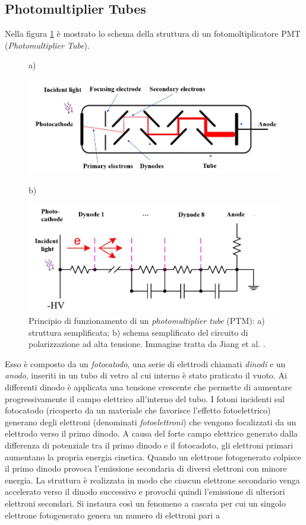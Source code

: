 \subsection{Photomultiplier Tubes}
Nella figura \ref{fig:ptm} è mostrato lo schema della struttura di un fotomoltiplicatore PMT (\textit{Photomultiplier Tube}).
\begin{figure}[tbh]
	\centering
	a)
	\begin{minipage}{.70\textwidth}
		\includegraphics[width=\linewidth]{./ImageFiles/ptm.jpg}
	\end{minipage}

	b)
	\begin{minipage}{.70\textwidth}
		\includegraphics[width=\linewidth]{./ImageFiles/ptm_schema.jpg}
	\end{minipage}
	\caption{Principio di funzionamento di un \textit{photomultiplier tube} (PTM): a) struttura semplificata; b) schema semplificato del circuito di polarizzazione ad alta tensione. Immagine tratta da Jiang et al. \cite{Jiang2019}.}
	\label{fig:ptm}
\end{figure}
Esso è composto da un \textit{fotocatodo}, una serie di elettrodi chiamati \textit{dinodi} e un \textit{anodo}, inseriti in un tubo di vetro al cui interno è stato praticato il vuoto. Ai differenti dinodo è applicata una tensione crescente che permette di aumentare progressivamente il campo elettrico all'interno del tubo. I fotoni incidenti sul fotocatodo (ricoperto da un materiale che favorisce l'effetto fotoelettrico) generano degli elettroni (denominati \textit{fotoelettroni}) che vengono focalizzati da un elettrodo verso il primo dinodo. A causa del forte campo elettrico generato dalla differenza di potenziale tra il primo dinodo e il fotocadoto, gli elettroni primari aumentano la propria energia cinetica. Quando un elettrone fotogenerato colpisce il primo dinodo provoca l'emissione secondaria di diversi elettroni con minore energia. La struttura è realizzata in modo che ciascun elettrone secondario venga accelerato verso il dinodo successivo e provochi quindi l'emissione di ulteriori elettroni secondari. Si instaura così un fenomeno a cascata per cui un singolo elettrone fotogenerato genera un numero di elettroni pari a 
